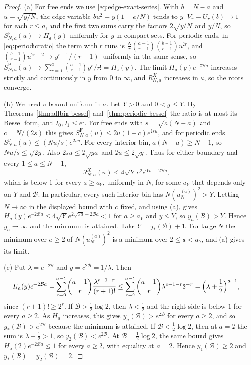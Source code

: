 \begin{proof}
(a) For free ends we use \eqref{eq:edge-exact-series}.
With $b=N-a$ and $u=\sqrt{y/N}$, the edge variable $bu^2=y(1-a/N)$ tends to $y$,
$V_r=U_r(b)\to1$ for each $r\le a$, and the first two sums carry the factors
$2\sqrt{y/N}$ and $y/N$, so $S^{\mathrm F}_{N,a}(u)\to H_a(y)$ uniformly for $y$
in compact sets. For periodic ends, in \eqref{eq:periodicratio} the term with
$r$ runs is $\frac Nr\binom{a-1}{r-1}\binom{b-1}{r-1}u^{2r}$, and
$\binom{b-1}{r-1}u^{2r-2}\to y^{r-1}/(r-1)!$ uniformly in the same sense, so
$S^{\mathrm P}_{N,a}(u)\to\sum_{r=1}^a\binom{a-1}{r-1}y^r/r!=H_a(y)$. The
limit $H_a(y)e^{-2\mathcal Ba}$ increases strictly and continuously in $y$ from
$0$ to $\infty$, and $R^X_{N,a}$ increases in $u$, so the roots converge.

(b) We need a bound uniform in $a$. Let $Y>0$ and $0<y\le Y$. By
Theorems~\ref{thm:allbin-bessel} and~\ref{thm:periodic-bessel} the ratio is at
most its Bessel form, and $I_0,I_1\le e^z$. For free ends with
$s=\sqrt{a(N-a)}$ and $c=N/(2s)$ this gives
$S^{\mathrm F}_{N,a}(u)\le2u(1+c)e^{2su}$, and for periodic ends
$S^{\mathrm P}_{N,a}(u)\le(Nu/s)e^{2su}$. For every interior bin,
$a(N-a)\ge N-1$, so $Nu/s\le\sqrt{2y}$. Also
$2su\le2\sqrt{ya}$ and $2u\le2\sqrt y$. Thus for either boundary and every
$1\le a\le N-1$,
\[
R^X_{N,a}(u)\le4\sqrt Y\,e^{2\sqrt{Ya}-2\mathcal Ba},
\]
which is below $1$ for every $a\ge a_Y$, uniformly in $N$, for some $a_Y$
that depends only on $Y$ and $\mathcal B$. In particular,
every such interior bin has $N(u^{(a)}_N)^2>Y$. Letting
$N\to\infty$ in the displayed bound with $a$ fixed, and using (a), gives
$H_a(y)e^{-2\mathcal Ba}\le4\sqrt Y\,e^{2\sqrt{Ya}-2\mathcal Ba}<1$ for
$a\ge a_Y$ and $y\le Y$, so $y_a(\mathcal B)>Y$. Hence $y_a\to\infty$ and
the minimum is attained. Take $Y=y_*(\mathcal B)+1$. For large $N$ the minimum
over $a\ge2$ of $N(u^{(a)}_N)^2$ is a minimum over $2\le a<a_Y$, and (a) gives
its limit.

(c) Put $\lambda=e^{-2\mathcal B}$ and $y=e^{2\mathcal B}=1/\lambda$. Then
\[
H_a(y)e^{-2\mathcal Ba}=\sum_{r=0}^{a-1}\binom{a-1}r\frac{\lambda^{a-1-r}}{(r+1)!}
\le\sum_{r=0}^{a-1}\binom{a-1}r\lambda^{a-1-r}2^{-r}=\Bigl(\lambda+\frac12\Bigr)^{a-1},
\]
since $(r+1)!\ge2^r$. If $\mathcal B>\frac12\log2$, then $\lambda<\frac12$ and the
right side is below $1$ for every $a\ge2$. As $H_a$ increases, this gives
$y_a(\mathcal B)>e^{2\mathcal B}$ for every $a\ge2$, and so
$y_*(\mathcal B)>e^{2\mathcal B}$ because the minimum is attained. If
$\mathcal B<\frac12\log2$, then at $a=2$ the sum is $\lambda+\frac12>1$, so
$y_2(\mathcal B)<e^{2\mathcal B}$. At $\mathcal B=\frac12\log2$, the same
bound gives $H_a(2)e^{-2\mathcal Ba}\le1$ for every $a\ge2$, with equality
at $a=2$. Hence $y_a(\mathcal B)\ge2$ and $y_*(\mathcal B)=y_2(\mathcal B)=2$.
\end{proof}

